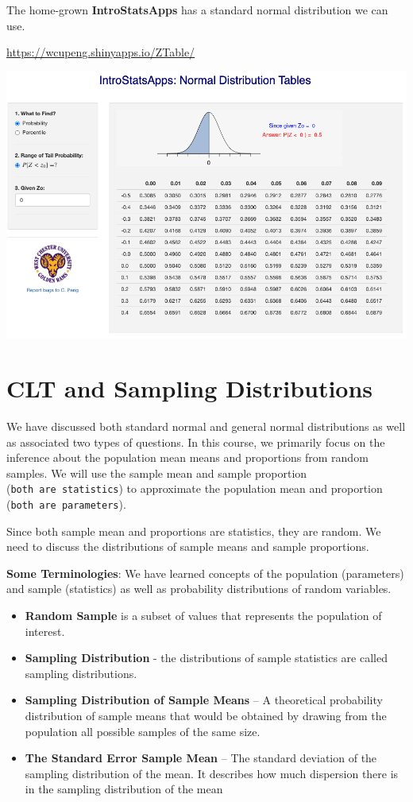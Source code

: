 \documentclass[
]{book}
\begin{document}
The home-grown \textbf{IntroStatsApps} has a standard normal distribution we can use.

\url{https://wcupeng.shinyapps.io/ZTable/}

\begin{center}\includegraphics[width=0.8\linewidth]{week04/introStatsApps-Ztable} \end{center}

\hypertarget{clt-and-sampling-distributions}{%
\chapter{CLT and Sampling Distributions}\label{clt-and-sampling-distributions}}

We have discussed both standard normal and general normal distributions as well as associated two types of questions. In this course, we primarily focus on the inference about the population mean means and proportions from random samples. We will use the sample mean and sample proportion (\texttt{both\ are\ statistics}) to approximate the population mean and proportion (\texttt{both\ are\ parameters}).

Since both sample mean and proportions are statistics, they are random. We need to discuss the distributions of sample means and sample proportions.

\textbf{Some Terminologies}: We have learned concepts of the population (parameters) and sample (statistics) as well as probability distributions of random variables.

\begin{itemize}
\item
  \textbf{Random Sample} is a subset of values that represents the population of interest.
\item
  \textbf{Sampling Distribution} - the distributions of sample statistics are called sampling distributions.
\item
  \textbf{Sampling Distribution of Sample Means} -- A theoretical probability distribution of sample means that would be obtained by drawing from the population all possible samples of the same size.
\item
  \textbf{The Standard Error Sample Mean} -- The standard deviation of the sampling distribution of the mean. It describes how much dispersion there is in the sampling distribution of the mean
\end{itemize}
\end{document}
